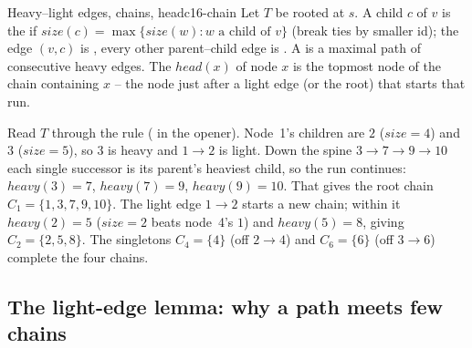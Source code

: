 \begin{definition}{Heavy--light edges, chains, head}{c16-chain}
Let \(T\) be rooted at \(s\).  A child \(c\) of \(v\) is the  if \(\mathit{size}(c)=\max\{\mathit{size}(w): w \text{ a child of } v\}\) (break ties by smaller id); the edge \((v,c)\) is , every other parent--child edge is .  A  is a maximal path of consecutive heavy edges.  The  \(\mathit{head}(x)\) of node \(x\) is the topmost node of the chain containing \(x\) -- the node just after a light edge (or the root) that starts that run.
\end{definition}

Read \(T\) through the rule ( in the opener).  Node~1's children are \(2\) (\(\mathit{size}=4\)) and \(3\) (\(\mathit{size}=5\)), so \(3\) is heavy and \(1\!\to\!2\) is light.  Down the spine \(3\!\to\!7\!\to\!9\!\to\!10\) each single successor is its parent's heaviest child, so the run continues: \(\mathit{heavy}(3)=7\), \(\mathit{heavy}(7)=9\), \(\mathit{heavy}(9)=10\).  That gives the root chain \(C_1=\{1,3,7,9,10\}\).  The light edge \(1\!\to\!2\) starts a new chain; within it \(\mathit{heavy}(2)=5\) (\(\mathit{size}=2\) beats node~4's \(1\)) and \(\mathit{heavy}(5)=8\), giving \(C_2=\{2,5,8\}\).  The singletons \(C_4=\{4\}\) (off \(2\!\to\!4\)) and \(C_6=\{6\}\) (off \(3\!\to\!6\)) complete the four chains.

\subsection{The light-edge lemma: why a path meets few chains}

